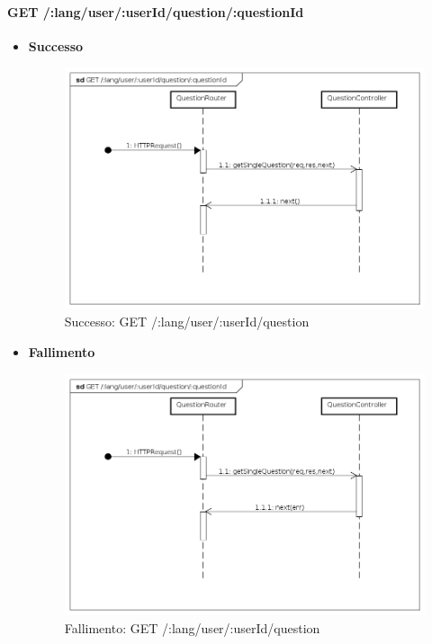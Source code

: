 





\paragraph{GET /:lang/user/:userId/question/:questionId}
\begin{itemize}
\item \textbf{Successo}


\begin{figure}[ht]
	\centering
	\includegraphics[scale=0.45]{UML/DiagrammiDiSequenza/Back-end/GET__lang_user__userId_question__questionId_success.png}
	\caption{Successo: GET /:lang/user/:userId/question}
\end{figure}
\FloatBarrier

\item \textbf{Fallimento}


\begin{figure}[ht]
	\centering
	\includegraphics[scale=0.45]{UML/DiagrammiDiSequenza/Back-end/GET__lang_user__userId_question__questionId_failure.png}
	\caption{Fallimento: GET /:lang/user/:userId/question}
\end{figure}
\FloatBarrier

\end{itemize}






